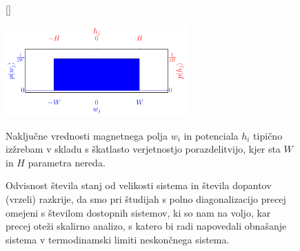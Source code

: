 \begin{figure}[H]
[\FBwidth]
{\caption{Naključne vrednosti magnetnega polja $w_i$ in potenciala $h_i$ tipično izžrebam v skladu s škatlasto verjetnostjo porazdelitvijo, kjer sta $W$ in $H$ parametra nereda. }\label{fig:prob_dist}}
{\includegraphics[width=0.62\textwidth]{prob_dist.pdf}}
\end{figure}
\begin{figure}[H]
\caption{Odvisnost števila stanj od velikosti sistema in števila dopantov (vrzeli) razkrije, da smo pri študijah s polno diagonalizacijo precej omejeni s številom dostopnih sistemov, ki so nam na voljo, kar precej oteži skalirno analizo, s katero bi radi napovedali obnašanje sistema v termodinamski limiti neskončnega sistema.}
\label{fig:tJ_num_states}
\end{figure}

